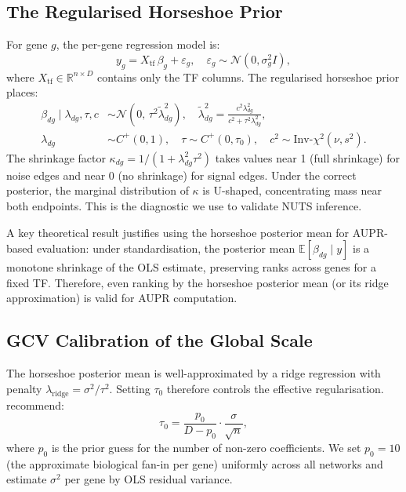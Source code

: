 \documentclass[11pt]{article}
\begin{document}
\subsection{The Regularised Horseshoe Prior}

For gene $g$, the per-gene regression model is:
\begin{equation}
  y_g = X_{\mathrm{tf}}\,\beta_g + \varepsilon_g, \quad \varepsilon_g \sim \mathcal{N}(0, \sigma_g^2 I),
\end{equation}
where $X_{\mathrm{tf}} \in \mathbb{R}^{n \times D}$ contains only the TF columns.
The regularised horseshoe prior \citep{piironen2017} places:
\begin{align}
  \beta_{dg} \mid \lambda_{dg}, \tau, c &\sim \mathcal{N}\!\left(0,\, \tau^2 \tilde\lambda_{dg}^2\right), \quad
  \tilde\lambda_{dg}^2 = \frac{c^2 \lambda_{dg}^2}{c^2 + \tau^2 \lambda_{dg}^2}, \\
  \lambda_{dg} &\sim C^+(0,1), \quad \tau \sim C^+(0, \tau_0), \quad c^2 \sim \mathrm{Inv\text{-}}\chi^2(\nu, s^2).
\end{align}
The shrinkage factor $\kappa_{dg} = 1/(1 + \lambda_{dg}^2 \tau^2)$ takes values near 1
(full shrinkage) for noise edges and near 0 (no shrinkage) for signal edges. Under the
correct posterior, the marginal distribution of $\kappa$ is U-shaped, concentrating mass
near both endpoints. This is the diagnostic we use to validate NUTS inference.

A key theoretical result justifies using the horseshoe posterior mean for AUPR-based
evaluation: under standardisation, the posterior mean $\mathbb{E}[\beta_{dg} \mid y]$ is
a monotone shrinkage of the OLS estimate, preserving ranks across genes for a fixed TF.
Therefore, even ranking by the horseshoe posterior mean (or its ridge approximation) is
valid for AUPR computation.

\subsection{GCV Calibration of the Global Scale}

The horseshoe posterior mean is well-approximated by a ridge regression with penalty
$\lambda_{\mathrm{ridge}} = \sigma^2 / \tau^2$. Setting $\tau_0$ therefore controls the
effective regularisation. \citet{piironen2017} recommend:
\begin{equation}
  \tau_0 = \frac{p_0}{D - p_0} \cdot \frac{\sigma}{\sqrt{n}},
  \label{eq:tau0}
\end{equation}
where $p_0$ is the prior guess for the number of non-zero coefficients.
We set $p_0 = 10$ (the approximate biological fan-in per gene) uniformly across all
networks and estimate $\sigma^2$ per gene by OLS residual variance.
\end{document}
